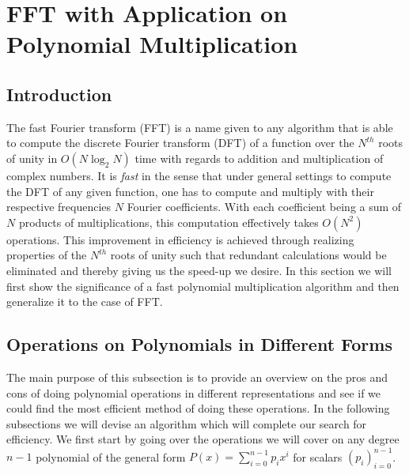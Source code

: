 \documentclass[12pt]{article}
\begin{document}
\section{FFT with Application on Polynomial Multiplication}
\subsection{Introduction}
The fast Fourier transform (FFT) is a name given to any algorithm that is able to compute the discrete Fourier transform (DFT) of a function over the $N^{th}$ roots of unity in $O(N\log_2{N})$ time with regards to addition and multiplication of complex numbers. It is \emph{fast} in the sense that under general settings to compute the DFT of any given function, one has to compute and multiply with their respective frequencies $N$ Fourier coefficients. With each coefficient being a sum of $N$ products of multiplications, this computation effectively takes $O(N^2)$ operations. This improvement in efficiency is achieved through realizing properties of the $N^{th}$ roots of unity such that redundant calculations would be eliminated and thereby giving us the speed-up we desire. In this section we will first show the significance of a fast polynomial multiplication algorithm and then generalize it to the case of FFT.

\subsection{Operations on Polynomials in Different Forms}
The main purpose of this subsection is to provide an overview on the pros and cons of doing polynomial operations in different representations and see if we could find the most efficient method of doing these operations. In the following subsections we will devise an algorithm which will complete our search for efficiency. We first start by going over the operations we will cover on any degree $n-1$ polynomial of the general form $P(x) = \sum_{i=0}^{n-1} p_ix^i$ for scalars $(p_i)_{i=0}^{n-1}$.
\end{document}
